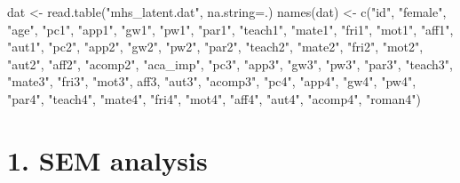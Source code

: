 \documentclass[
  letterpaper,
  DIV=11,
  numbers=noendperiod]{scrartcl}
\newenvironment{Shaded}{\begin{snugshade}}{\end{snugshade}}
\newcommand{\AttributeTok}[1]{\textcolor[rgb]{0.40,0.45,0.13}{#1}}
\newcommand{\FunctionTok}[1]{\textcolor[rgb]{0.28,0.35,0.67}{#1}}
\newcommand{\NormalTok}[1]{\textcolor[rgb]{0.00,0.23,0.31}{#1}}
\newcommand{\OtherTok}[1]{\textcolor[rgb]{0.00,0.23,0.31}{#1}}
\newcommand{\StringTok}[1]{\textcolor[rgb]{0.13,0.47,0.30}{#1}}
\begin{document}
\begin{Shaded}
\begin{Highlighting}[]
\NormalTok{dat }\OtherTok{\textless{}{-}} \FunctionTok{read.table}\NormalTok{(}\StringTok{"mhs\_latent.dat"}\NormalTok{, }\AttributeTok{na.string=}\StringTok{\textquotesingle{}.\textquotesingle{}}\NormalTok{)}
\FunctionTok{names}\NormalTok{(dat) }\OtherTok{\textless{}{-}} \FunctionTok{c}\NormalTok{(}\StringTok{"id"}\NormalTok{, }\StringTok{"female"}\NormalTok{, }\StringTok{"age"}\NormalTok{,}
                \StringTok{"pc1"}\NormalTok{, }\StringTok{"app1"}\NormalTok{, }\StringTok{"gw1"}\NormalTok{, }\StringTok{"pw1"}\NormalTok{, }\StringTok{"par1"}\NormalTok{, }\StringTok{"teach1"}\NormalTok{, }\StringTok{"mate1"}\NormalTok{, }\StringTok{"fri1"}\NormalTok{, }\StringTok{"mot1"}\NormalTok{, }\StringTok{"aff1"}\NormalTok{, }\StringTok{"aut1"}\NormalTok{,}
                \StringTok{"pc2"}\NormalTok{, }\StringTok{"app2"}\NormalTok{, }\StringTok{"gw2"}\NormalTok{, }\StringTok{"pw2"}\NormalTok{, }\StringTok{"par2"}\NormalTok{, }\StringTok{"teach2"}\NormalTok{, }\StringTok{"mate2"}\NormalTok{, }\StringTok{"fri2"}\NormalTok{, }\StringTok{"mot2"}\NormalTok{, }\StringTok{"aut2"}\NormalTok{, }\StringTok{"aff2"}\NormalTok{, }\StringTok{"acomp2"}\NormalTok{, }\StringTok{"aca\_imp"}\NormalTok{,}
                \StringTok{"pc3"}\NormalTok{, }\StringTok{"app3"}\NormalTok{, }\StringTok{"gw3"}\NormalTok{, }\StringTok{"pw3"}\NormalTok{, }\StringTok{"par3"}\NormalTok{, }\StringTok{"teach3"}\NormalTok{, }\StringTok{"mate3"}\NormalTok{, }\StringTok{"fri3"}\NormalTok{, }\StringTok{"mot3"}\NormalTok{, }\StringTok{\textquotesingle{}aff3\textquotesingle{}}\NormalTok{, }\StringTok{"aut3"}\NormalTok{, }\StringTok{"acomp3"}\NormalTok{,}
                \StringTok{"pc4"}\NormalTok{, }\StringTok{"app4"}\NormalTok{, }\StringTok{"gw4"}\NormalTok{, }\StringTok{"pw4"}\NormalTok{, }\StringTok{"par4"}\NormalTok{, }\StringTok{"teach4"}\NormalTok{, }\StringTok{"mate4"}\NormalTok{, }\StringTok{"fri4"}\NormalTok{, }\StringTok{"mot4"}\NormalTok{, }\StringTok{"aff4"}\NormalTok{, }\StringTok{"aut4"}\NormalTok{, }\StringTok{"acomp4"}\NormalTok{, }\StringTok{"roman4"}\NormalTok{)}
\end{Highlighting}
\end{Shaded}

\section{1. SEM analysis}\label{sem-analysis}
\end{document}
